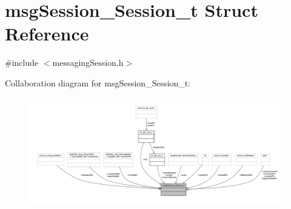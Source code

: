 \hypertarget{structmsg_session___session__t}{}\section{msg\+Session\+\_\+\+Session\+\_\+t Struct Reference}
\label{structmsg_session___session__t}


{\ttfamily \#include $<$messaging\+Session.\+h$>$}



Collaboration diagram for msg\+Session\+\_\+\+Session\+\_\+t\+:
\nopagebreak
\begin{figure}[H]
\begin{center}
\leavevmode
\includegraphics[width=350pt]{structmsg_session___session__t__coll__graph}
\end{center}
\end{figure}

